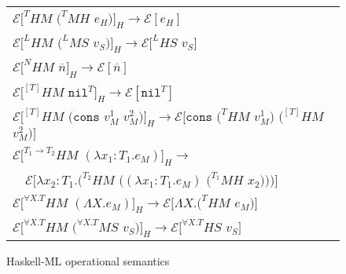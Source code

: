 \begin{figure}[p]
\centering
\begin{tabular}{l}
$\mathscr{E}[^{T}HM$ $(^{T}MH$ $e_{H})]_{H}\rightarrow\mathscr{E}[e_{H}]$ \\
$\mathscr{E}[^{L}HM$ $(^{L}MS$ $v_{S})]_{H}\rightarrow\mathscr{E}[^{L}HS$ $v_{S}]$ \\
$\mathscr{E}[^{N}HM$ $\overline{n}]_{H}\rightarrow\mathscr{E}[\overline{n}]$ \\
$\mathscr{E}[^{[T]}HM$ $\mathtt{nil}^{T}]_{H}\rightarrow\mathscr{E}[\mathtt{nil}^{T}]$ \\
$\mathscr{E}[^{[T]}HM$ $(\mathtt{cons}$ $v_{M}^{1}$ $v_{M}^{2})]_{H}\rightarrow\mathscr{E}[\mathtt{cons}$ $(^{T}HM$ $v_{M}^{1})$ $(^{[T]}HM$ $v_{M}^{2})]$ \\
$\mathscr{E}[^{T_{1}\rightarrow T_{2}}HM$ $(\lambda x_{1}:T_{1}.e_{M})]_{H}\rightarrow$ \\
$\quad\mathscr{E}[\lambda x_{2}:T_{1}.(^{T_{2}}HM$ $((\lambda x_{1}:T_{1}.e_{M})$ $(^{T_{1}}MH$ $x_{2})))]$ \\
$\mathscr{E}[^{\forall X.T}HM$ $(\Lambda X.e_{M})]_{H}\rightarrow\mathscr{E}[\Lambda X.(^{T}HM$ $e_{M})]$ \\
$\mathscr{E}[^{\forall X.T}HM$ $(^{\forall X.T}MS$ $v_{S})]_{H}\rightarrow\mathscr{E}[^{\forall X.T}HS$ $v_{S}]$ \\
\end{tabular}
\caption{Haskell-ML operational semantics}
\label{hmos}
\end{figure}